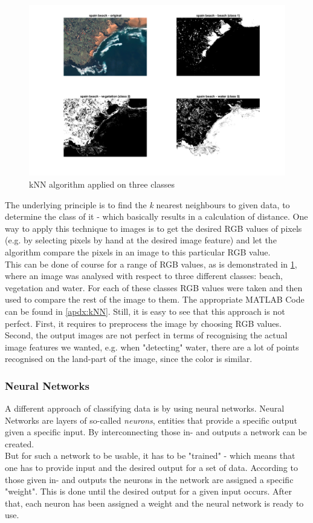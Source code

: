 \begin{figure}[h!]
	\centering
	\includegraphics[width=\textwidth]{images/kNN.png}
	\caption{kNN algorithm applied on three classes}
	\label{fig:kNN}
\end{figure}

The underlying principle is to find the \textit{k} nearest neighbours to given data, to determine the class of it - which basically results in a calculation of distance. One way to apply this technique to images is to get the desired RGB values of pixels (e.g. by selecting pixels by hand at the desired image feature) and let the algorithm compare the pixels in an image to this particular RGB value.\\
This can be done of course for a range of RGB values, as is demonstrated in \cref{fig:kNN}, where an image was analysed with respect to three different classes: beach, vegetation and water. For each of these classes RGB values were taken and then used to compare the rest of the image to them. The appropriate MATLAB Code can be found in \cref{apdx:kNN}. Still, it is easy to see that this approach is not perfect. First, it requires to preprocess the image by choosing RGB values. Second, the output images are not perfect in terms of recognising the actual image features we wanted, e.g. when "detecting" water, there are a lot of points recognised on the land-part of the image, since the color is similar.


\subsubsection{Neural Networks}
A different approach of classifying data is by using neural networks. Neural Networks are layers of so-called \textit{neurons}, entities that provide a specific output given a specific input. By interconnecting those in- and outputs a network can be created.\\
But for such a network to be usable, it has to be "trained" - which means that one has to provide input and the desired output for a set of data. According to those given in- and outputs the neurons in the network are assigned a specific "weight". This is done until the desired output for a given input occurs. After that, each neuron has been assigned a weight and the neural network is ready to use.

